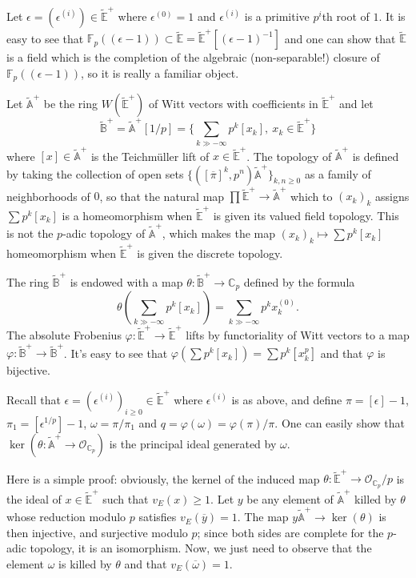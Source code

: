 \documentclass[11pt]{amsart}
\def\F{{\mathbb F}_p}
\def\ra{\rightarrow}
\def\Cp{\mathbb{C}_p}
\def\OO{\mathcal{O}}
\def\et{\widetilde{\mathbb{E}}}
\def\atplus{\widetilde{\mathbb{A}}^+}
\def\btplus{\widetilde{\mathbb{B}}^+}
\def\etplus{\widetilde{\mathbb{E}}^+}
\begin{document}
Let $\epsilon=(\epsilon^{(i)}) \in \etplus$ where  
$\epsilon^{(0)}=1$ and $\epsilon^{(i)}$ is a primitive  
$p^i$th root of $1$.  
It is easy to see that  
$\F((\epsilon-1)) \subset \et = \etplus[(\epsilon-1)^{-1}]$ and one can show that  
$\et$ is a field which is the completion of 
the algebraic (non-separable!) closure of $\F((\epsilon-1))$, so it is 
really a familiar object.  
 
Let $\atplus$ be the ring $W(\etplus)$  
of Witt vectors with coefficients in 
$\etplus$ and let \[ \btplus=\atplus[1/p]=\{  
\sum_{k\gg -\infty} p^k [x_k],\ x_k \in \etplus 
\} \] where $[x] \in \atplus$ is the Teichm{\"u}ller  
lift of $x \in \etplus$.   
The topology of $\atplus$  
is defined by taking the collection of open sets  
$\{ ([\overline{\pi}]^k,p^n)\atplus \}_{k,n \geq 0}$  
as a family of neighborhoods of $0$, so that the natural map $\prod 
\etplus \ra \atplus$ which to $(x_k)_k$ assigns $\sum p^k [x_k]$ is a 
homeomorphism when $\etplus$ is given its valued field topology. 
This is not the $p$-adic topology of $\atplus$, which makes the map 
$(x_k)_k \mapsto \sum p^k [x_k]$ homeomorphism when $\etplus$ is given 
the discrete topology. 
  
The ring $\btplus$ is 
endowed with a map $\theta: \btplus \ra \Cp$ defined  
by the formula  
\[ \theta\left(\sum_{k\gg -\infty} p^k[x_k] \right) 
=\sum_{k\gg -\infty} p^k x_k^{(0)}. \] 
The absolute Frobenius $\varphi: \etplus \ra \etplus$ lifts by 
functoriality of Witt vectors 
to a map $\varphi: \btplus \ra \btplus$. It's easy to see that  
$\varphi(\sum p^k [x_k])=\sum p^k [x_k^p]$ and that $\varphi$ is 
bijective.  
 
Recall that $\epsilon=(\epsilon^{(i)})_{i \geq 0} 
\in\etplus$ where $\epsilon^{(i)}$  
is as above,  
and define $\pi=[\epsilon]-1$, $\pi_1= 
[\epsilon^{1/p}]-1$, $\omega=\pi/\pi_1$ 
and $q=\varphi(\omega)=\varphi(\pi)/\pi$.  
One can easily show that $\ker(\theta : \atplus \ra \OO_{\Cp})$ 
is the principal ideal generated by $\omega$. 
 
Here is a simple proof: obviously, the kernel of  
the induced map 
$\theta: \etplus \ra \OO_{\Cp}/p$ 
is the ideal of $x \in \etplus$ such that $v_E(x) \geq 1$. Let $y$ be any element of 
$\atplus$ killed by $\theta$ whose reduction modulo $p$ satisfies $v_E(\overline{y})=1$. 
The map $y \atplus \ra \ker(\theta)$ is then injective, and surjective modulo $p$; since 
both sides are complete for the $p$-adic topology, it is an isomorphism. Now, we just need 
to observe that the element $\omega$ is killed by $\theta$  
and that $v_E(\overline{\omega})=1$. 
 
\end{document}
